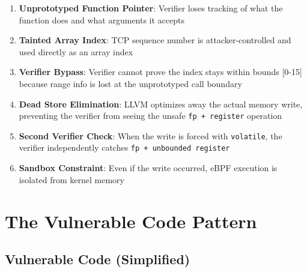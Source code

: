 \begin{enumerate}[label=\arabic*.]
  \item \textbf{Unprototyped Function Pointer}: Verifier loses tracking of what the function does and what arguments it accepts
  \item \textbf{Tainted Array Index}: TCP sequence number is attacker-controlled and used directly as an array index
  \item \textbf{Verifier Bypass}: Verifier cannot prove the index stays within bounds [0-15] because range info is lost at the unprototyped call boundary
  \item \textbf{Dead Store Elimination}: LLVM optimizes away the actual memory write, preventing the verifier from seeing the unsafe \texttt{fp + register} operation
  \item \textbf{Second Verifier Check}: When the write is forced with \texttt{volatile}, the verifier independently catches \texttt{fp + unbounded register}
  \item \textbf{Sandbox Constraint}: Even if the write occurred, eBPF execution is isolated from kernel memory
\end{enumerate}

\section{The Vulnerable Code Pattern}

\subsection{Vulnerable Code (Simplified)}

